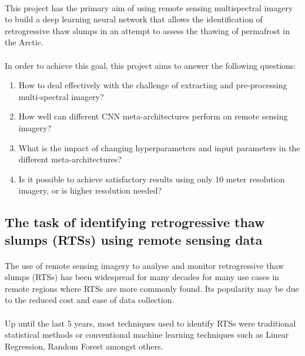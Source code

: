 \documentclass{article}
\begin{document}
\paragraph{}
This project has the primary aim of using remote sensing multispectral imagery to build a deep learning neural network that allows the identification of retrogressive thaw slumps in an attempt to assess the thawing of permafrost in the Arctic.

\paragraph{}
In order to achieve this goal, this project aims to answer the following questions:

\begin{enumerate}
    \item How to deal effectively with the challenge of extracting and pre-processing multi-spectral imagery?
    \item How well can different CNN meta-architectures perform on remote sensing imagery?
    \item What is the impact of changing hyperparameters and input parameters in the different meta-architectures?
    \item Is it possible to achieve satisfactory results using only 10 meter resolution imagery, or is higher resolution needed?
\end{enumerate}

\paragraph{}

\subsection{The task of identifying retrogressive thaw slumps (RTSs) using remote sensing data}
\paragraph{}
The use of remote sensing imagery to analyse and monitor retrogressive thaw slumps (RTSs) has been widespread for many decades for many use cases in remote regions where RTSs are more commonly found. Its popularity may be due to the reduced cost and ease of data collection.
\paragraph{}
Up until the last 5 years, most techniques used to identify RTSs were traditional statistical methods or conventional machine learning techniques such as Linear Regression, Random Forest amongst others.
\end{document}
